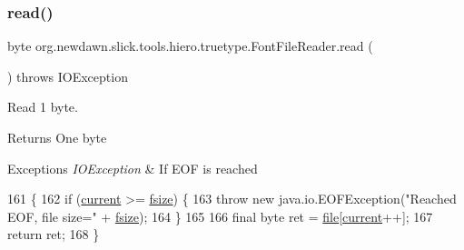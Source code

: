 \subsubsection{\texorpdfstring{read()}{read()}}
{\footnotesize\ttfamily byte org.\+newdawn.\+slick.\+tools.\+hiero.\+truetype.\+Font\+File\+Reader.\+read (\begin{DoxyParamCaption}{ }\end{DoxyParamCaption}) throws I\+O\+Exception\hspace{0.3cm}{\ttfamily [inline]}}

Read 1 byte.

\begin{DoxyReturn}{Returns}
One byte 
\end{DoxyReturn}

\begin{DoxyExceptions}{Exceptions}
{\em I\+O\+Exception} & If E\+OF is reached \\
\hline
\end{DoxyExceptions}

\begin{DoxyCode}
161                                           \{
162         \textcolor{keywordflow}{if} (\mbox{\hyperlink{classorg_1_1newdawn_1_1slick_1_1tools_1_1hiero_1_1truetype_1_1_font_file_reader_ab082d04b7f0a287496055b8e5f203cb4}{current}} >= \mbox{\hyperlink{classorg_1_1newdawn_1_1slick_1_1tools_1_1hiero_1_1truetype_1_1_font_file_reader_a247fb2663cf669a7842919c405f41bfe}{fsize}}) \{
163             \textcolor{keywordflow}{throw} \textcolor{keyword}{new} java.io.EOFException(\textcolor{stringliteral}{"Reached EOF, file size="} + \mbox{\hyperlink{classorg_1_1newdawn_1_1slick_1_1tools_1_1hiero_1_1truetype_1_1_font_file_reader_a247fb2663cf669a7842919c405f41bfe}{fsize}});
164         \}
165 
166         \textcolor{keyword}{final} byte ret = \mbox{\hyperlink{classorg_1_1newdawn_1_1slick_1_1tools_1_1hiero_1_1truetype_1_1_font_file_reader_ab4c57b8a3e3eba60293c11bf50d7cc42}{file}}[\mbox{\hyperlink{classorg_1_1newdawn_1_1slick_1_1tools_1_1hiero_1_1truetype_1_1_font_file_reader_ab082d04b7f0a287496055b8e5f203cb4}{current}}++];
167         \textcolor{keywordflow}{return} ret;
168     \}
\end{DoxyCode}
\mbox{\label{classorg_1_1newdawn_1_1slick_1_1tools_1_1hiero_1_1truetype_1_1_font_file_reader_ad8ae5f03abb0907cb8162ae2d266129e}} 
